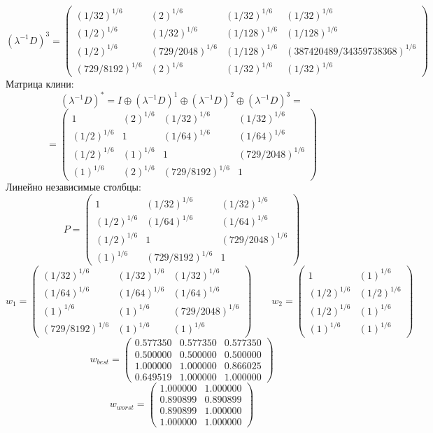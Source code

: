$$(\lambda^{-1}D)^3 = \begin{pmatrix}
(1/32)^{1/6} & (2)^{1/6} & (1/32)^{1/6} & (1/32)^{1/6}\\
(1/2)^{1/6} & (1/32)^{1/6} & (1/128)^{1/6} & (1/128)^{1/6}\\
(1/2)^{1/6} & (729/2048)^{1/6} & (1/128)^{1/6} & (387420489/34359738368)^{1/6}\\
(729/8192)^{1/6} & (2)^{1/6} & (1/32)^{1/6} & (1/32)^{1/6}
\end{pmatrix}
$$
Матрица клини:
$$(\lambda^{-1}D)^* = I \oplus (\lambda^{-1}D)^1 \oplus (\lambda^{-1}D)^2 \oplus (\lambda^{-1}D)^3 = $$
$$ = \begin{pmatrix}
1 & (2)^{1/6} & (1/32)^{1/6} & (1/32)^{1/6}\\
(1/2)^{1/6} & 1 & (1/64)^{1/6} & (1/64)^{1/6}\\
(1/2)^{1/6} & (1)^{1/6} & 1 & (729/2048)^{1/6}\\
(1)^{1/6} & (2)^{1/6} & (729/8192)^{1/6} & 1
\end{pmatrix}
$$
Линейно независимые столбцы:
$$P = \begin{pmatrix}
1 & (1/32)^{1/6} & (1/32)^{1/6}\\
(1/2)^{1/6} & (1/64)^{1/6} & (1/64)^{1/6}\\
(1/2)^{1/6} & 1 & (729/2048)^{1/6}\\
(1)^{1/6} & (729/8192)^{1/6} & 1
\end{pmatrix}
$$
$$w_1 = \begin{pmatrix}
(1/32)^{1/6} & (1/32)^{1/6} & (1/32)^{1/6}\\
(1/64)^{1/6} & (1/64)^{1/6} & (1/64)^{1/6}\\
(1)^{1/6} & (1)^{1/6} & (729/2048)^{1/6}\\
(729/8192)^{1/6} & (1)^{1/6} & (1)^{1/6}
\end{pmatrix}
\qquad w_2 = \begin{pmatrix}
1 & (1)^{1/6}\\
(1/2)^{1/6} & (1/2)^{1/6}\\
(1/2)^{1/6} & (1)^{1/6}\\
(1)^{1/6} & (1)^{1/6}
\end{pmatrix}
$$
$$w_{best} = \begin{pmatrix}
0.577350 & 0.577350 & 0.577350\\
0.500000 & 0.500000 & 0.500000\\
1.000000 & 1.000000 & 0.866025\\
0.649519 & 1.000000 & 1.000000
\end{pmatrix}
$$
$$w_{worst} = \begin{pmatrix}
1.000000 & 1.000000\\
0.890899 & 0.890899\\
0.890899 & 1.000000\\
1.000000 & 1.000000
\end{pmatrix}
$$

